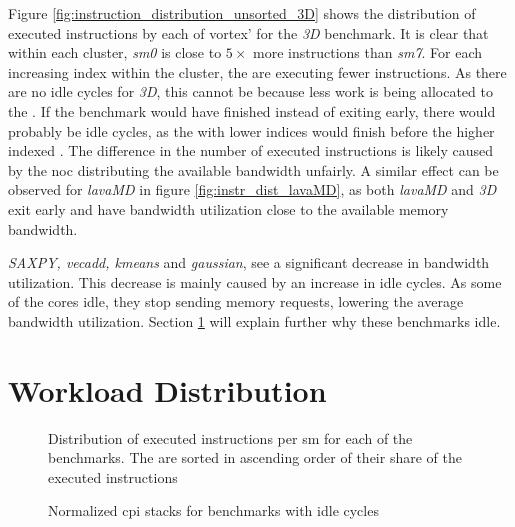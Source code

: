 Figure \ref{fig:instruction_distribution_unsorted_3D} shows the distribution of executed instructions by each of \Gls{vortex}'  for the \textit{3D} benchmark. It is clear that within each cluster, \textit{\acrshort{sm}0} is  close to $5\times$ more instructions than \textit{\acrshort{sm}7}. For each increasing index within the cluster, the  are executing fewer instructions. As there are no idle cycles for \textit{3D}, this cannot be because less work is being allocated to the . If the benchmark would have finished instead of exiting early, there would probably be idle cycles, as the  with lower indices would finish before the higher indexed . The difference in the number of executed instructions is likely caused by the \acrshort{noc} distributing the available bandwidth unfairly. A similar effect can be observed for \textit{lavaMD} in figure \ref{fig:instr_dist_lavaMD}, as both \textit{lavaMD} and \textit{3D} exit early and have bandwidth utilization close to the available memory bandwidth.

\textit{SAXPY, vecadd, kmeans} and \textit{gaussian}, see a significant decrease in bandwidth utilization. This decrease is mainly caused by an increase in idle cycles. As some of the cores idle, they stop sending memory requests, lowering the average bandwidth utilization. Section \ref{sec:workload_dist} will explain further why these benchmarks idle.

\newpage
\section{Workload Distribution} \label{sec:workload_dist}

\begin{figure}

\caption[Distribution of executed instructions per \acrshort{sm}.]{Distribution of executed instructions per \acrshort{sm} for each of the benchmarks. The  are sorted in ascending order of their share of the executed instructions}
\label{fig:instruction_distribution}
\end{figure}

\begin{figure}
    \centering
    \caption{Normalized \acrshort{cpi} stacks for benchmarks with idle cycles}
    \label{fig:norm_cpi_idle}
\end{figure}

